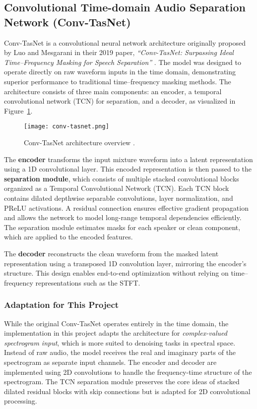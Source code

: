 \subsection{Convolutional Time-domain Audio Separation Network (Conv-TasNet)}

Conv-TasNet is a convolutional neural network architecture originally proposed by Luo and Mesgarani in their 2019 paper, \textit{``Conv-TasNet: Surpassing Ideal Time--Frequency Masking for Speech Separation''} \cite{luo2019conv}. The model was designed to operate directly on raw waveform inputs in the time domain, demonstrating superior performance to traditional time--frequency masking methods. The architecture consists of three main components: an encoder, a temporal convolutional network (TCN) for separation, and a decoder, as visualized in Figure~\ref{fig:convtasnet}.

\begin{figure}[h]
    \centering
    \texttt{[image: conv-tasnet.png]}
    \caption{\label{fig:convtasnet}Conv-TasNet architecture overview \cite{luo2019conv}.}
\end{figure}

The \textbf{encoder} transforms the input mixture waveform into a latent representation using a 1D convolutional layer. This encoded representation is then passed to the \textbf{separation module}, which consists of multiple stacked convolutional blocks organized as a Temporal Convolutional Network (TCN). Each TCN block contains dilated depthwise separable convolutions, layer normalization, and PReLU activations. A residual connection ensures effective gradient propagation and allows the network to model long-range temporal dependencies efficiently. The separation module estimates masks for each speaker or clean component, which are applied to the encoded features.

The \textbf{decoder} reconstructs the clean waveform from the masked latent representation using a transposed 1D convolution layer, mirroring the encoder’s structure. This design enables end-to-end optimization without relying on time--frequency representations such as the STFT.

\subsubsection*{Adaptation for This Project}

While the original Conv-TasNet operates entirely in the time domain, the implementation in this project adapts the architecture for \textit{complex-valued spectrogram input}, which is more suited to denoising tasks in spectral space. Instead of raw audio, the model receives the real and imaginary parts of the spectrogram as separate input channels. The encoder and decoder are implemented using 2D convolutions to handle the frequency-time structure of the spectrogram. The TCN separation module preserves the core ideas of stacked dilated residual blocks with skip connections but is adapted for 2D convolutional processing.

